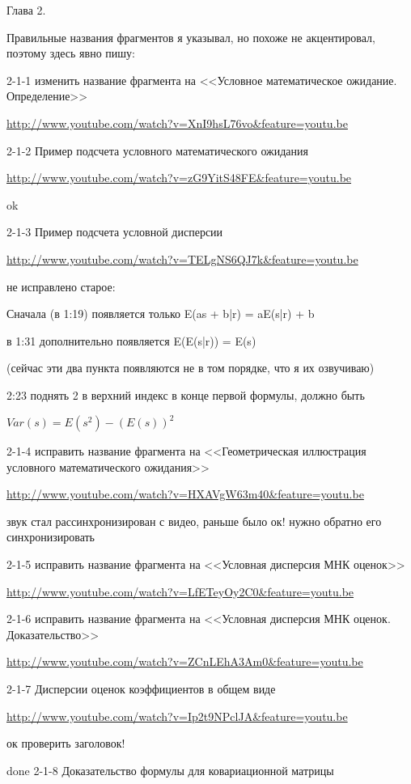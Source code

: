 \documentclass[12pt,a4paper]{article}
\begin{document}
Глава 2.

Правильные названия фрагментов я указывал, но похоже не акцентировал, поэтому здесь явно пишу:

2-1-1 изменить название фрагмента на <<Условное математическое ожидание. Определение>>

\url{http://www.youtube.com/watch?v=XnI9hsL76vo&feature=youtu.be}

2-1-2 Пример подсчета условного математического ожидания

\url{http://www.youtube.com/watch?v=zG9YitS48FE&feature=youtu.be}

ok

2-1-3 Пример подсчета условной дисперсии

\url{http://www.youtube.com/watch?v=TELgNS6QJ7k&feature=youtu.be}

не исправлено старое:

Сначала (в 1:19) появляется только E(as + b|r) = aE(s|r) + b

в 1:31 дополнительно появляется E(E(s|r)) = E(s)

(сейчас эти два пункта появляются не в том порядке, что я их озвучиваю)



2:23 поднять 2 в верхний индекс в конце первой формулы, должно быть

$Var(s)=E(s^2)-(E(s))^2$


2-1-4 исправить название фрагмента на <<Геометрическая иллюстрация условного математического ожидания>>

\url{http://www.youtube.com/watch?v=HXAVgW63m40&feature=youtu.be}

звук стал рассинхронизирован с видео, раньше было ок! нужно обратно его синхронизировать

2-1-5 исправить название фрагмента на <<Условная дисперсия МНК оценок>>

\url{http://www.youtube.com/watch?v=LfETeyOy2C0&feature=youtu.be}


2-1-6  исправить название фрагмента на <<Условная дисперсия МНК оценок. Доказательство>>

\url{http://www.youtube.com/watch?v=ZCnLEhA3Am0&feature=youtu.be}

2-1-7 Дисперсии оценок коэффициентов в общем виде

\url{http://www.youtube.com/watch?v=Ip2t9NPclJA&feature=youtu.be}

ок проверить заголовок!

done
2-1-8 Доказательство формулы для ковариационной матрицы
\end{document}
